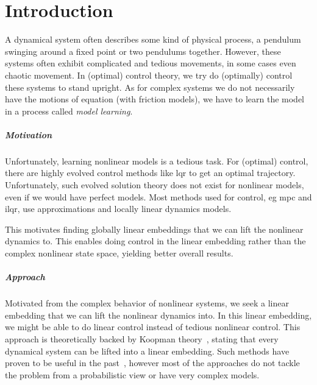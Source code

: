 \chapter{Introduction}
\label{c:introduction}



A dynamical system often describes some kind of physical process, \eg a pendulum swinging around a fixed point or two pendulums together. However, these systems often exhibit complicated and tedious movements, in some cases even chaotic movement. In (optimal) control theory, we try do (optimally) control these systems to \eg stand upright. As for complex systems we do not necessarily have the motions of equation (\eg with friction models), we have to learn the model in a process called \emph{model learning}.

\paragraph{Motivation}
	Unfortunately, learning nonlinear models is a tedious task. For (optimal) control, there are highly evolved control methods like \ac{lqr} to get an optimal trajectory. Unfortunately, such evolved solution theory does not exist for nonlinear models, even if we would have perfect models. Most methods used for control, \ac{eg} \ac{mpc} and \ac{ilqr}, use approximations and locally linear dynamics models.

	This motivates finding globally linear embeddings that we can lift the nonlinear dynamics to. This enables doing control in the linear embedding rather than the complex nonlinear state space, yielding better overall results.

\paragraph{Approach}
	Motivated from the complex behavior of nonlinear systems, we seek a linear embedding that we can lift the nonlinear dynamics into. In this linear embedding, we might be able to do linear control instead of tedious nonlinear control. This approach is theoretically backed by Koopman theory~\cite{koopmanHamiltonianSystemsTransformation1931}, stating that every dynamical system can be lifted into a linear embedding. Such methods have proven to be useful in the past~\cite{kaiserDatadrivenDiscoveryKoopman2020,hanDeepLearningKoopman2020,mortonDeepVariationalKoopman2019a}, however most of the approaches do not tackle the problem from a probabilistic view or have very complex models.

